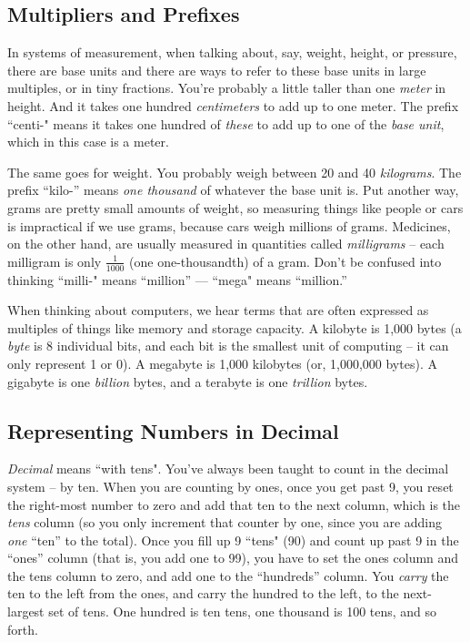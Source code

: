 \newpage

\subsection*{Multipliers and Prefixes}

In systems of measurement, when talking about, say, weight, height, or pressure, there are base units and there are ways to refer to these base units in large multiples, or in tiny fractions. You're probably a little taller than one \emph{meter} in height. And it takes one hundred \emph{centimeters} to add up to one meter. The prefix ``centi-" means it takes one hundred of \emph{these} to add up to one of the \emph{base unit}, which in this case is a meter.

The same goes for weight. You probably weigh between 20 and 40 \emph{kilograms}. The prefix ``{kilo-}'' means \emph{one thousand} of whatever the base unit is. Put another way, grams are pretty small amounts of weight, so measuring things like people or cars is impractical if we use grams, because cars weigh millions of grams. Medicines, on the other hand,  are usually measured in quantities called \emph{milligrams} -- each milligram is only $\frac{1}{1000}$ (one one-thousandth) of a gram. Don't be confused into thinking ``milli-" means ``million'' --- ``mega" means ``million.''

When thinking about computers, we hear terms that are often expressed as multiples of things like memory and storage capacity. A kilobyte is 1,000 bytes (a \emph{byte} is 8 individual bits, and each bit is the smallest unit of computing -- it can only represent 1 or 0). A megabyte is 1,000 kilobytes (or, 1,000,000 bytes). A gigabyte is one \emph{billion} bytes, and a terabyte is one \emph{trillion} bytes. 


\newpage
\subsection*{Representing Numbers in Decimal}

\emph{Decimal} means ``with tens". You've always been taught to count in the decimal system -- by ten. When you are counting by ones, once you get past 9, you reset the right-most number to zero and add that ten to the next column, which is the \emph{tens} column (so you only increment that counter by one, since you are adding \emph{one} ``ten'' to the total). Once you fill up 9 ``tens" (90) and count up past 9 in the ``ones'' column (that is, you add one to 99), you have to set the ones column and the tens column to zero, and add one to the ``hundreds'' column. You \emph{carry} the ten to the left from the ones, and carry the hundred to the left, to the next-largest set of tens. One hundred is ten tens, one thousand is 100 tens, and so forth.

